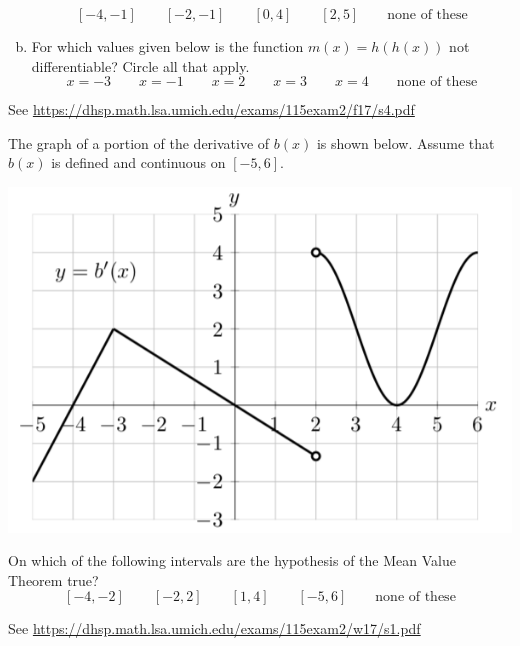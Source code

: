 \documentclass[11pt]{exam}
\begin{document}
\begin{questions}
\begin{enumerate}[(a)]
	$$[-4,-1] \qquad [-2,-1] \qquad [0,4] \qquad [2,5] \qquad \textrm{none of these}$$
	\item For which values given below is the function $m(x) = h(h(x))$ not differentiable?
  Circle all that apply.
  $$x=-3 \qquad x=-1 \qquad x=2 \qquad x=3 \qquad x=4 \qquad \textrm{none of these}$$
	\end{enumerate}
        \begin{solution}
          See \href{https://dhsp.math.lsa.umich.edu/exams/115exam2/f17/s4.pdf}{https://dhsp.math.lsa.umich.edu/exams/115exam2/f17/s4.pdf}
        \end{solution}
\question The graph of a portion of the derivative of $b(x)$ is shown below. Assume that $b(x)$ is defined and continuous on $[-5, 6]$.
\begin{center}
  \includegraphics[scale=0.4]{Winter2017Exam2Problem1}
\end{center}
On which of the following intervals are the hypothesis of the Mean Value Theorem true?
		$$[-4,-2] \qquad [-2,2] \qquad [1,4] \qquad [-5,6] \qquad \textrm{none of these}$$
                \begin{solution}
                 See \href{https://dhsp.math.lsa.umich.edu/exams/115exam2/w17/s1.pdf}{https://dhsp.math.lsa.umich.edu/exams/115exam2/w17/s1.pdf}  
                \end{solution}

\end{questions}
\end{document}
